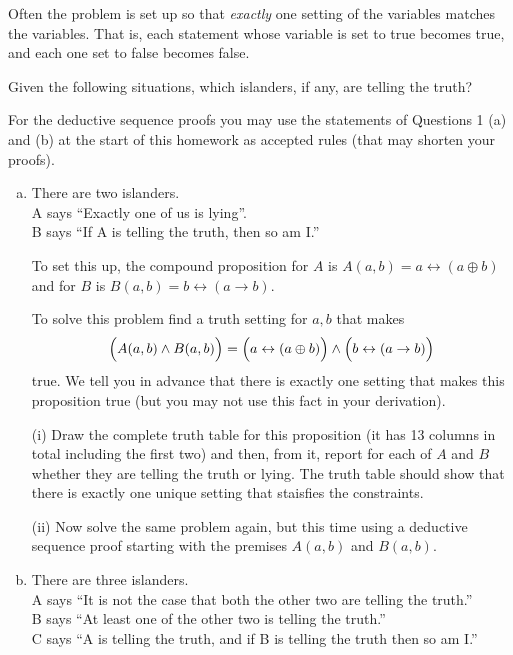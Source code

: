 \documentclass[12pt]{article}
\begin{document}
	\medskip

	Often the problem is set up so that {\em exactly} one setting of the variables
	matches the variables. That is, each statement whose variable is set to true becomes
	true, and each one set to false becomes false.

	\medskip

	Given the following situations, which islanders, if any, are telling the truth?

	\medskip

	For the deductive sequence proofs you may use the statements of Questions 1 (a)
	and (b) at the start of this homework as accepted rules (that may shorten your
	proofs).

	\begin{enumerate}[(a)]
		\item There are two islanders.\\
			A says “Exactly one of us is lying”.\\
			B says “If A is telling the truth, then so am I.”

			To set this up, the compound proposition for $A$ is
			$A(a,b) = a \leftrightarrow (a \oplus b)$\\
			and for $B$ is $B(a,b) = b \leftrightarrow (a \rightarrow b).$

			To solve this problem find a truth setting for $a,b$ that makes
			\[
				\Bigl(A(a,b) \wedge B(a,b)\Bigr) = \Bigl( a \leftrightarrow (a \oplus b)\Bigr
				) \wedge \Bigl( b \leftrightarrow (a \rightarrow b)\Bigr)
			\]
			true. We tell you in advance that there is exactly one setting that makes this
			proposition true (but you may not use this fact in your derivation).

			\medskip

			(i) Draw the complete truth table for this proposition (it has 13 columns in
			total including the first two) and then, from it, report for each of $A$
			and $B$ whether they are telling the truth or lying. The truth table should
			show that there is exactly one unique setting that staisfies the constraints.

			(ii) Now solve the same problem again, but this time using a deductive
			sequence proof starting with the premises $A(a,b)$ and $B(a,b).$

		\item There are three islanders.\\
			A says “It is not the case that both the other two are telling the truth.”
			\\
			B says “At least one of the other two is telling the truth.” \\
			C says “A is telling the truth, and if B is telling the truth then so am I.”


\end{enumerate}
\end{document}
